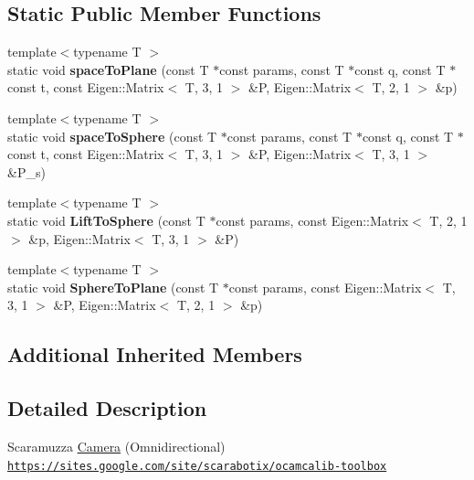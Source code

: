 \subsection*{Static Public Member Functions}
\begin{DoxyCompactItemize}
\item 
\mbox{\label{classcamodocal_1_1OCAMCamera_a04db8f70bc4db87024f3f0c3ca1a1190}} 
{\footnotesize template$<$typename T $>$ }\\static void {\bfseries space\+To\+Plane} (const T $\ast$const params, const T $\ast$const q, const T $\ast$const t, const Eigen\+::\+Matrix$<$ T, 3, 1 $>$ \&P, Eigen\+::\+Matrix$<$ T, 2, 1 $>$ \&p)
\item 
\mbox{\label{classcamodocal_1_1OCAMCamera_adfc168c2c3e6f1859ea662074e9232f2}} 
{\footnotesize template$<$typename T $>$ }\\static void {\bfseries space\+To\+Sphere} (const T $\ast$const params, const T $\ast$const q, const T $\ast$const t, const Eigen\+::\+Matrix$<$ T, 3, 1 $>$ \&P, Eigen\+::\+Matrix$<$ T, 3, 1 $>$ \&P\+\_\+s)
\item 
\mbox{\label{classcamodocal_1_1OCAMCamera_abaf64fe1ceeb4b96034d89296fb3a72c}} 
{\footnotesize template$<$typename T $>$ }\\static void {\bfseries Lift\+To\+Sphere} (const T $\ast$const params, const Eigen\+::\+Matrix$<$ T, 2, 1 $>$ \&p, Eigen\+::\+Matrix$<$ T, 3, 1 $>$ \&P)
\item 
\mbox{\label{classcamodocal_1_1OCAMCamera_af974df35838672ae829e5d885b701011}} 
{\footnotesize template$<$typename T $>$ }\\static void {\bfseries Sphere\+To\+Plane} (const T $\ast$const params, const Eigen\+::\+Matrix$<$ T, 3, 1 $>$ \&P, Eigen\+::\+Matrix$<$ T, 2, 1 $>$ \&p)
\end{DoxyCompactItemize}
\subsection*{Additional Inherited Members}


\subsection{Detailed Description}
Scaramuzza \hyperlink{classcamodocal_1_1Camera}{Camera} (Omnidirectional) \href{https://sites.google.com/site/scarabotix/ocamcalib-toolbox}{\tt https\+://sites.\+google.\+com/site/scarabotix/ocamcalib-\/toolbox} 

